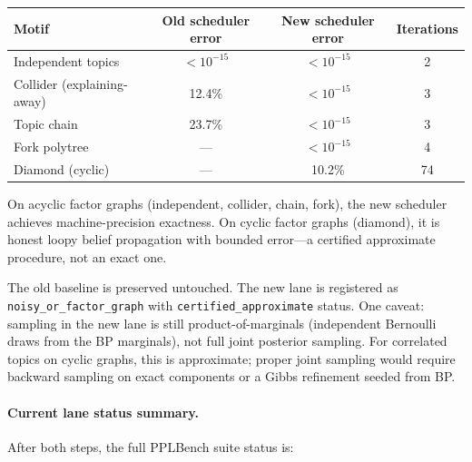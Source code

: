 \documentclass[11pt,openany]{report}
\begin{document}
\begin{center}
\small
\begin{tabular}{lccc}
\toprule
Motif & Old scheduler error & New scheduler error & Iterations \\
\midrule
Independent topics & $< 10^{-15}$ & $< 10^{-15}$ & 2 \\
Collider (explaining-away) & 12.4\% & $< 10^{-15}$ & 3 \\
Topic chain & 23.7\% & $< 10^{-15}$ & 3 \\
Fork polytree & --- & $< 10^{-15}$ & 4 \\
Diamond (cyclic) & --- & 10.2\% & 74 \\
\bottomrule
\end{tabular}
\end{center}

\noindent
On acyclic factor graphs (independent, collider, chain, fork), the new
scheduler achieves machine-precision exactness.  On cyclic factor graphs
(diamond), it is honest loopy belief propagation with bounded error---a
certified approximate procedure, not an exact one.

The old  baseline is preserved untouched.
The new lane is registered as \texttt{noisy\_or\_factor\_graph} with
\texttt{certified\_approximate} status.  One caveat: sampling in the new lane
is still product-of-marginals (independent Bernoulli draws from the BP
marginals), not full joint posterior sampling.  For correlated topics on
cyclic graphs, this is approximate; proper joint sampling would require
backward sampling on exact components or a Gibbs refinement seeded from BP.

\paragraph{Current lane status summary.}
After both steps, the full PPLBench suite status is:
\end{document}
